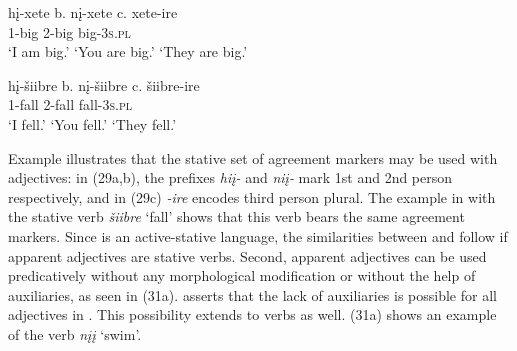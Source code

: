 \documentclass[output=paper]{LSP/langsci}
\begin{document}
\begin{exe}
\ex\label{ex:rosen:29}
\begin{xlist}
\ex \gll
hį-xete \hspace{36pt} b. {}  nį-xete \hspace{48pt} c. {} xete-ire\\
1-big {} {} {} 2-big {} {}  {} big-\textsc{3s.pl}\\
\glt `I am big.' \hspace{1.2cm} `You are big.' \hspace{1.1cm} `They are big.'

\end{xlist}
\end{exe}

\begin{exe}
\ex\label{ex:rosen:30}
\begin{xlist}
\ex \gll
hį-šiibre \hspace{30pt}  b. {} nį-šiibre \hspace{43pt} c. {} šiibre-ire\\
1-fall {} {} {} 2-fall {} {} {} fall-\textsc{3s.pl}\\
\glt `I fell.' \hspace{2cm} `You fell.'  \hspace{1.7cm} `They fell.'


\end{xlist}
\end{exe}

Example  illustrates that the stative set of agreement markers may be used with adjectives: in (29a,b), the prefixes \textit{hiį-} and \textit{niį-} mark 1st and 2nd person respectively, and in (29c) \textit{-ire} encodes third person plural. The example in  with the stative verb \textit{šiibre} `fall' shows that this verb bears the same agreement markers. Since  is an active-stative language, the similarities between  and  follow if apparent adjectives are stative verbs. Second, apparent adjectives can be used predicatively without any morphological modification or without the help of auxiliaries, as seen in (31a). \citet{Helmbrecht2006b} asserts that the lack of auxiliaries is possible for all adjectives in . This possibility extends to verbs as well. (31a) shows an example of the verb \textit{nįį} `swim'.
\end{document}
